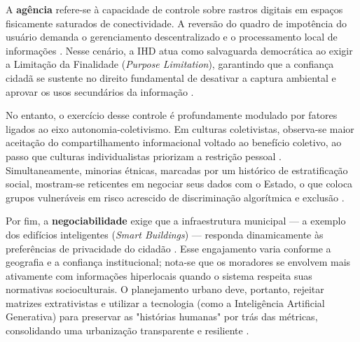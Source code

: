 \documentclass[12pt]{article}
\begin{document}
A \textbf{agência} refere-se à capacidade de controle sobre rastros digitais em espaços fisicamente saturados de conectividade. A reversão do quadro de impotência do usuário demanda o gerenciamento descentralizado e o processamento local de informações \cite{Victorelli2024Adopting, durango2024data, Theys2024, Theys, Hutton2017, Meireles2016, Crabtree2016}. Nesse cenário, a IHD atua como salvaguarda democrática ao exigir a Limitação da Finalidade (\textit{Purpose Limitation}), garantindo que a confiança cidadã se sustente no direito fundamental de desativar a captura ambiental e aprovar os usos secundários da informação \cite{Sailaja2021, Lockwood2021, Mashhadi2014, DOWTHWAITE2024, Brombacher20221863, Bowyer2022, Crabtree2021, Zou2020769, hayes2024making, Meechan2023, Royle2023, Payne2023, Strey2019Human}.

No entanto, o exercício desse controle é profundamente modulado por fatores ligados ao eixo autonomia-coletivismo. Em culturas coletivistas, observa-se maior aceitação do compartilhamento informacional voltado ao benefício coletivo, ao passo que culturas individualistas priorizam a restrição pessoal \cite{Locoro2020}. Simultaneamente, minorias étnicas, marcadas por um histórico de estratificação social, mostram-se reticentes em negociar seus dados com o Estado, o que coloca grupos vulneráveis em risco acrescido de discriminação algorítmica e exclusão \cite{Yuan20243615, Lenzi2024, malgieri2020vulnerable, chalhoub2024useful, Parviainen2016}.

Por fim, a \textbf{negociabilidade} exige que a infraestrutura municipal — a exemplo dos edifícios inteligentes (\textit{Smart Buildings}) — responda dinamicamente às preferências de privacidade do cidadão \cite{DOWTHWAITE2024, Nelson2023, bavaresco2019technological, Elhamdadi2022, Xiao2021, Koesten2021, Sailaja2024334, Chowdhury2016, Seidelin2018}. Esse engajamento varia conforme a geografia e a confiança institucional; nota-se que os moradores se envolvem mais ativamente com informações hiperlocais quando o sistema respeita suas normativas socioculturais. O planejamento urbano deve, portanto, rejeitar matrizes extrativistas e utilizar a tecnologia (como a Inteligência Artificial Generativa) para preservar as "histórias humanas" por trás das métricas, consolidando uma urbanização transparente e resiliente \cite{Briggs2021, Sailaja2021, Jandric2023, Belizario2023Interacao, calvetti2024human, Calvetti2021173, Stead2022, Turkay2021, coleti2024humanSillabus, Refat2023, Chatzimichali2021160}.
    
\end{document}
